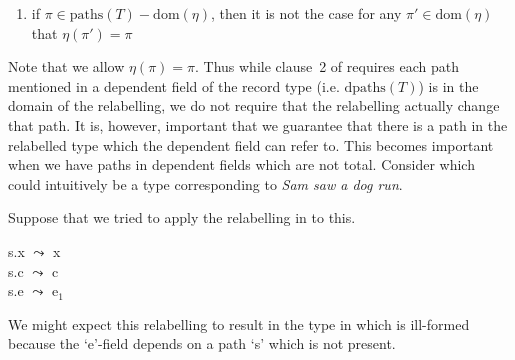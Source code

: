 \begin{shaded}
\begin{ex}
\begin{enumerate}
  
\item if $\pi\in\mathrm{paths}(T)-\mathrm{dom}(\eta)$, then it is not
  the case for any $\pi'\in\mathrm{dom}(\eta)$ that $\eta(\pi')=\pi$
 
\end{enumerate} 
  
\end{ex} 
Note that we allow $\eta(\pi)=\pi$.  Thus while clause~2 of \preveg{} requires each path
mentioned in a dependent field of the record type
(i.e. $\mathrm{dpaths}(T)$) is in the domain of
the relabelling, we do not require that the relabelling actually
change that path.  It is, however, important that we guarantee that
there is a path in the relabelled type which the dependent field can
refer to.  This becomes important when we have paths in dependent
fields which are not total.  Consider \nexteg{} which could
intuitively be a type corresponding to \textit{Sam saw a dog run}.
\begin{ex} 
\end{ex} 
Suppose that we tried to apply the relabelling in \nexteg{} to this.
\begin{ex} 
  s.x $\leadsto$ x\\
  s.c $\leadsto$ c\\
  s.e $\leadsto$ e$_1$
\end{ex} 
We might expect this relabelling to result in the type in \nexteg{}
which is ill-formed because the `e'-field depends on a path `s' which
is not present.
\begin{ex} 
    

\end{ex}
\end{shaded}
